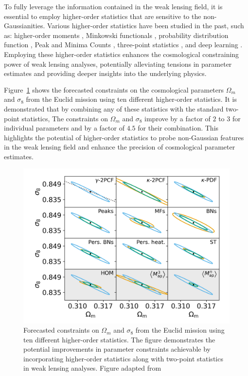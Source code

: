 To fully leverage the information contained in the weak lensing field, it is essential to employ higher-order statistics that are sensitive to the non-Gaussianities. Various higher-order statistics have been studied in the past, such as: higher-order moments \citep{2015PhRvD..91j3511P, 2020MNRAS.498.4060G}, Minkowski functionals \citep{2019JCAP...06..019M, 2022OJAp....5E..13G, 2024arXiv241000401A}, probability distribution function \citep{2021MNRAS.505.2886B, 2023arXiv230405928T, 2023OJAp....6E...1U}, Peak and Minima Counts \citep{2018MNRAS.474..712M, 2024MNRAS.528.4513M}, three-point statistics \citep{2004MNRAS.348..897T, 2014MNRAS.441.2725F}, and deep learning \citep{2018JCAP...10..051F, 2022PhRvD.105h3518F}. Employing these higher-order statistics enhances the cosmological constraining power of weak lensing analyses, potentially alleviating tensions in parameter estimates and providing deeper insights into the underlying physics. 

Figure~\ref{fig:Euclid_Forecast} \citep{2023A&A...675A.120E} shows the forecasted constraints on the cosmological parameters $\Omega_m$ and $\sigma_8$ from the Euclid mission using ten different higher-order statistics. It is demonstrated that by combining any of these statistics with the standard two-point statistics, The constraints on $\Omega_m$ and $\sigma_8$ improve by a factor of $2$ to $3$ for individual parameters and by a factor of $4.5$ for their combination. This highlights the potential of higher-order statistics to probe non-Gaussian features in the weak lensing field and enhance the precision of cosmological parameter estimates.

\begin{figure}[ht]
    \centering
    \includegraphics[width=\textwidth]{figures/Euclid_Forecast.png}
    \caption[Forecasted constraints on $\Omega_m$ and $\sigma_8$ from the Euclid mission using ten different higher-order statistics]{Forecasted constraints on $\Omega_m$ and $\sigma_8$ from the Euclid mission using ten different higher-order statistics. The figure demonstrates the potential improvements in parameter constraints achievable by incorporating higher-order statistics along with two-point statistics in weak lensing analyses. Figure adapted from \citet{2023A&A...675A.120E}}
    \label{fig:Euclid_Forecast}
\end{figure}


